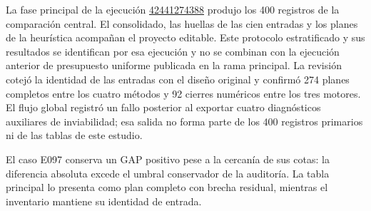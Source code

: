 La fase principal de la ejecución \href{https://github.com/sebastianporras-web/planeador-milp-rpm/actions/runs/42441274388}{42441274388} produjo los 400 registros de la comparación central. El consolidado, las huellas de las cien entradas y los planes de la heurística acompañan el proyecto editable. Este protocolo estratificado y sus resultados se identifican por esa ejecución y no se combinan con la ejecución anterior de presupuesto uniforme publicada en la rama principal. La revisión cotejó la identidad de las entradas con el diseño original y confirmó 274 planes completos entre los cuatro métodos y 92 cierres numéricos entre los tres motores. El flujo global registró un fallo posterior al exportar cuatro diagnósticos auxiliares de inviabilidad; esa salida no forma parte de los 400 registros primarios ni de las tablas de este estudio.

El caso E097 conserva un GAP positivo pese a la cercanía de sus cotas: la diferencia absoluta excede el umbral conservador de la auditoría. La tabla principal lo presenta como plan completo con brecha residual, mientras el inventario mantiene su identidad de entrada.
